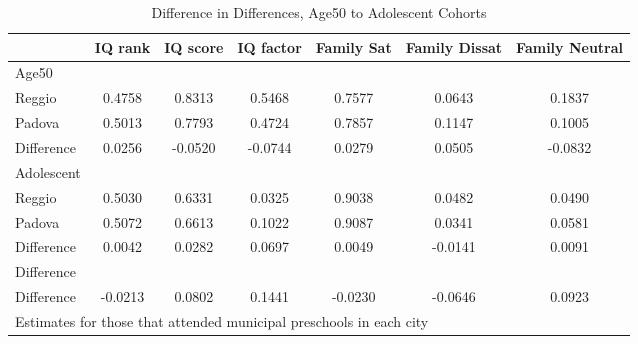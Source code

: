 \begin{table}[htbp]\centering
\caption{Difference in Differences, Age50 to Adolescent Cohorts}
\begin{tabular}{l*{6}{c}}
\hline\hline
            &     IQ rank&    IQ score&   IQ factor&  Family Sat&Family Dissat&Family Neutral\\
\hline
Age50       &            &            &            &            &            &            \\
Reggio      &      0.4758&      0.8313&      0.5468&      0.7577&      0.0643&      0.1837\\
Padova      &      0.5013&      0.7793&      0.4724&      0.7857&      0.1147&      0.1005\\
Difference  &      0.0256&     -0.0520&     -0.0744&      0.0279&      0.0505&     -0.0832\\
\hline
Adolescent  &            &            &            &            &            &            \\
Reggio      &      0.5030&      0.6331&      0.0325&      0.9038&      0.0482&      0.0490\\
Padova      &      0.5072&      0.6613&      0.1022&      0.9087&      0.0341&      0.0581\\
Difference  &      0.0042&      0.0282&      0.0697&      0.0049&     -0.0141&      0.0091\\
\hline
Difference  &            &            &            &            &            &            \\
Difference  &     -0.0213&      0.0802&      0.1441&     -0.0230&     -0.0646&      0.0923\\
\hline\hline
\multicolumn{7}{l}{\footnotesize Estimates for those that attended municipal preschools in each city}\\
\end{tabular}
\end{table}
